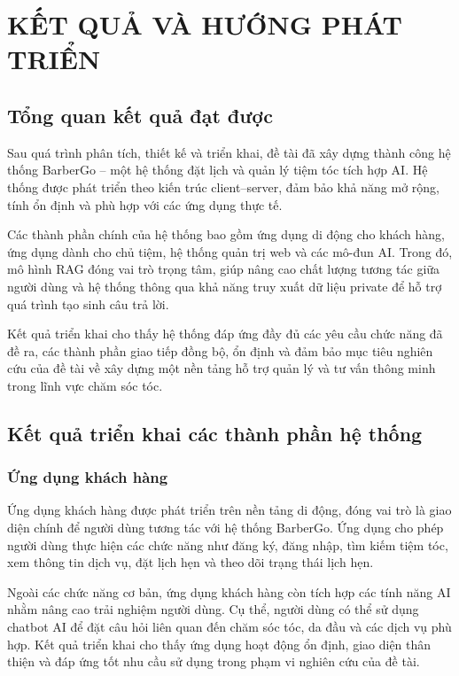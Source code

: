 \chapter{KẾT QUẢ VÀ HƯỚNG PHÁT TRIỂN}

\section{Tổng quan kết quả đạt được}

Sau quá trình phân tích, thiết kế và triển khai, đề tài đã xây dựng thành công hệ thống BarberGo – một hệ thống đặt lịch và quản lý tiệm tóc tích hợp AI. Hệ thống được phát triển theo kiến trúc client--server, đảm bảo khả năng mở rộng, tính ổn định và phù hợp với các ứng dụng thực tế.

Các thành phần chính của hệ thống bao gồm ứng dụng di động cho khách hàng, ứng dụng dành cho chủ tiệm, hệ thống quản trị web và các mô-đun AI. Trong đó, mô hình RAG đóng vai trò trọng tâm, giúp nâng cao chất lượng tương tác giữa người dùng và hệ thống thông qua khả năng truy xuất dữ liệu private để hỗ trợ quá trình tạo sinh câu trả lời.

Kết quả triển khai cho thấy hệ thống đáp ứng đầy đủ các yêu cầu chức năng đã đề ra, các thành phần giao tiếp đồng bộ, ổn định và đảm bảo mục tiêu nghiên cứu của đề tài về xây dựng một nền tảng hỗ trợ quản lý và tư vấn thông minh trong lĩnh vực chăm sóc tóc.

\section{Kết quả triển khai các thành phần hệ thống}

\subsection{Ứng dụng khách hàng}

Ứng dụng khách hàng được phát triển trên nền tảng di động, đóng vai trò là giao diện chính để người dùng tương tác với hệ thống BarberGo. Ứng dụng cho phép người dùng thực hiện các chức năng như đăng ký, đăng nhập, tìm kiếm tiệm tóc, xem thông tin dịch vụ, đặt lịch hẹn và theo dõi trạng thái lịch hẹn.

Ngoài các chức năng cơ bản, ứng dụng khách hàng còn tích hợp các tính năng AI nhằm nâng cao trải nghiệm người dùng. Cụ thể, người dùng có thể sử dụng chatbot AI để đặt câu hỏi liên quan đến chăm sóc tóc, da đầu và các dịch vụ phù hợp. Kết quả triển khai cho thấy ứng dụng hoạt động ổn định, giao diện thân thiện và đáp ứng tốt nhu cầu sử dụng trong phạm vi nghiên cứu của đề tài.


